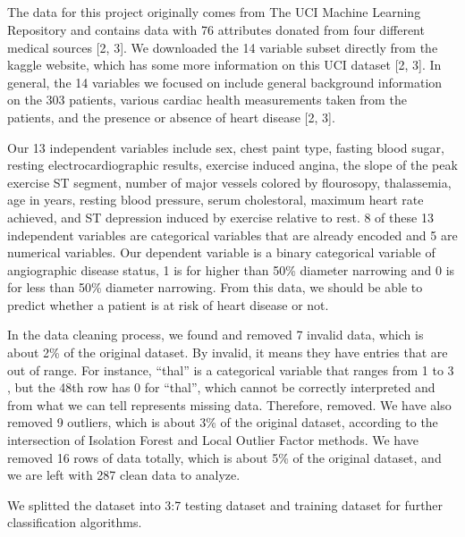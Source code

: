 \documentclass[12pt]{article}
\begin{document}
\subsection*{}
\hspace{\parindent} The data for this project originally comes from The UCI Machine Learning Repository and contains data with 76 attributes donated from four different medical sources [2, 3].  We downloaded the 14 variable subset directly from the kaggle website, which has some more information on this UCI dataset [2, 3]. In general, the 14 variables we focused on include general background information on the 303 patients, various cardiac health measurements taken from the patients, and the presence or absence of heart disease [2, 3]. 
\par Our 13 independent variables include sex, chest paint type, fasting blood sugar, resting electrocardiographic results, exercise induced angina, the slope of the peak exercise ST segment, number of major vessels colored by flourosopy, thalassemia, age in years, resting blood pressure, serum cholestoral, maximum heart rate achieved, and ST depression induced by exercise relative to rest. 8 of these 13 independent variables are categorical variables that are already encoded and 5 are numerical variables. Our dependent variable is a binary categorical variable of angiographic disease status, 1 is for higher than 50\% diameter narrowing and 0 is for less than 50\% diameter narrowing. From this data, we should be able to predict whether a patient is at risk of heart disease or not. 
\par In the data cleaning process, we found and removed 7 invalid data, which is about 2\% of the original dataset. By invalid, it means they have entries that are out of range. For instance, “thal” is a categorical variable that ranges from 1 to 3 , but the 48th row has 0 for “thal”, which cannot be correctly interpreted and from what we can tell represents missing data. Therefore, removed. We have also removed 9 outliers, which is about 3\% of the original dataset, according to the intersection of Isolation Forest and Local Outlier Factor methods. We have removed 16 rows of data totally, which is about 5\% of the original dataset, and we are left with 287 clean data to analyze. 
\par We splitted the dataset into 3:7 testing dataset and training dataset for further classification algorithms.
\end{document}
